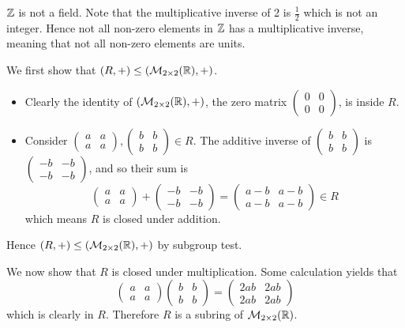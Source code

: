 \begin{questions}
    \item $\mathbb{Z}$ is not a field. Note that the multiplicative inverse of 2 is $\frac12$ which is not an integer. Hence not all non-zero elements in $\mathbb{Z}$ has a multiplicative inverse, meaning that not all non-zero elements are units.
    
    \item We first show that $(R, +) \leq (\mathcal{M}_{2\times2}(\mathbb{R}), +)$.
    \begin{itemize}
        \item Clearly the identity of $(\mathcal{M}_{2\times2}(\mathbb{R}), +)$, the zero matrix $\begin{pmatrix}0&0\\0&0\end{pmatrix}$, is inside $R$.
        \item Consider $\begin{pmatrix}a&a\\a&a\end{pmatrix}, \begin{pmatrix}b&b\\b&b\end{pmatrix} \in R$. The additive inverse of $\begin{pmatrix}b&b\\b&b\end{pmatrix}$ is $\begin{pmatrix}-b&-b\\-b&-b\end{pmatrix}$, and so their sum is
        \[
            \begin{pmatrix}a&a\\a&a\end{pmatrix} + \begin{pmatrix}-b&-b\\-b&-b\end{pmatrix} = \begin{pmatrix}a-b&a-b\\a-b&a-b\end{pmatrix} \in R
        \]
        which means $R$ is closed under addition.
    \end{itemize}
    Hence $(R, +) \leq (\mathcal{M}_{2\times2}(\mathbb{R}), +)$ by subgroup test.

    We now show that $R$ is closed under multiplication. Some calculation yields that
    \[
        \begin{pmatrix}a&a\\a&a\end{pmatrix}\begin{pmatrix}b&b\\b&b\end{pmatrix} = \begin{pmatrix}2ab&2ab\\2ab&2ab\end{pmatrix}
    \]
    which is clearly in $R$. Therefore $R$ is a subring of $\mathcal{M}_{2\times2}(\mathbb{R})$.
\end{questions}

